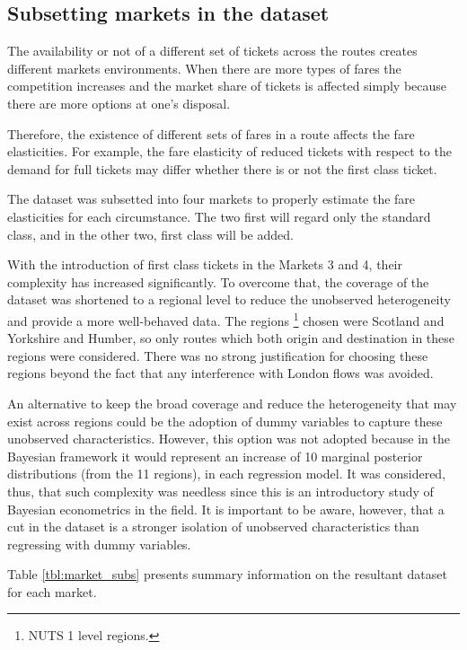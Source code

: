 \subsection{Subsetting markets in the dataset}

The availability or not of a different set of tickets across the routes creates different markets environments. When there are more types of fares the competition increases and the market share of tickets is affected simply because there are more options at one's disposal. 


Therefore, the existence of different sets of fares in a route affects the fare elasticities. For example, the fare elasticity of reduced tickets with respect to the demand for full tickets may differ whether there is or not the first class ticket.

The dataset was subsetted into four markets to properly estimate the fare elasticities for each circumstance. The two first will regard only the standard class, and in the other two, first class will be added. 

With the introduction of first class tickets in the Markets 3 and 4, their complexity has increased significantly. To overcome that, the coverage of the dataset was shortened to a regional level to reduce the unobserved heterogeneity and provide a more well-behaved data. The regions \footnote{NUTS 1 level regions.} chosen were Scotland and Yorkshire and Humber, so only routes which both origin and destination in these regions were considered. There was no strong justification for choosing these regions beyond the fact that any interference with London flows was avoided.

An alternative to keep the broad coverage and reduce the heterogeneity that may exist across regions could be the adoption of dummy variables to capture these unobserved characteristics. However, this option was not adopted because in the Bayesian framework it would represent an increase of 10 marginal posterior distributions (from the 11 regions), in each regression model. It was considered, thus, that such complexity was needless since this is an introductory study of Bayesian econometrics in the field. It is important to be aware, however, that a cut in the dataset is a stronger isolation of unobserved characteristics than regressing with dummy variables. 

Table \ref{tbl:market_subs} presents summary information on the resultant dataset for each market.

